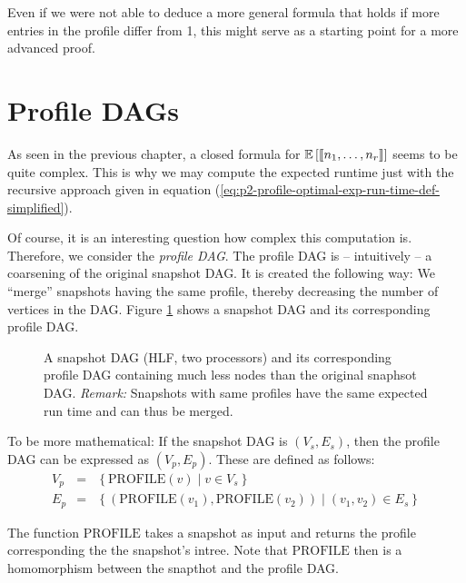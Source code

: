 Even if we were not able to deduce a more general formula that holds if more entries in the profile differ from 1, this might serve as a starting point for a more advanced proof.


\section{Profile DAGs}
\label{sec:p2-profile-dags}

As seen in the previous chapter, a closed formula for $\mathbb{E}\left[ \left\llbracket n_1,\dots,n_r \right\rrbracket \right]$ seems to be quite complex. This is why we may compute the expected runtime just with the recursive approach given in equation (\ref{eq:p2-profile-optimal-exp-run-time-def-simplified}).

Of course, it is an interesting question how complex this computation is. Therefore, we consider the \emph{profile DAG}. The profile DAG is -- intuitively -- a coarsening of the original snapshot DAG. It is created the following way: We ``merge'' snapshots having the same profile, thereby decreasing the number of vertices in the DAG. Figure \ref{fig:p2-profile-dag-example-000111223-hlfdet} shows a snapshot DAG and its corresponding profile DAG.

\begin{figure}[t]
  \centering
  
  \caption{A snapshot DAG (HLF, two processors) and its corresponding profile DAG containing much less nodes than the original snaphsot DAG. \emph{Remark:} Snapshots with same profiles have the same expected run time and can thus be merged. }
  \label{fig:p2-profile-dag-example-000111223-hlfdet}
\end{figure}

To be more mathematical: If the snapshot DAG is $(V_s, E_s)$, then the profile DAG can be expressed as $(V_p, E_p)$. These are defined as follows:
\begin{eqnarray*}
  V_p &=& \left\{ \text{PROFILE}(v) \mid v \in V_s \right\} \\
  E_p &=& \left\{ \left(\text{PROFILE}(v_1), \text{PROFILE}(v_2) \right) \mid (v_1, v_2)\in E_s\right\}
\end{eqnarray*}

The function $\text{PROFILE}$ takes a snapshot as input and returns the profile corresponding the the snapshot's intree. Note that $\text{PROFILE}$ then is a homomorphism between the snapthot and the profile DAG.

